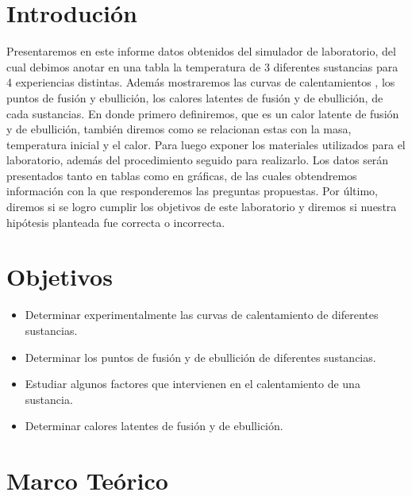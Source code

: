 \documentclass[a4paper, 12p]{article}
\begin{document}
\section{Introdución}
Presentaremos en este informe datos obtenidos del simulador de laboratorio, del cual debimos anotar en una tabla la temperatura de 3 diferentes sustancias para 4 experiencias distintas. Además mostraremos las curvas de calentamientos , los puntos de fusión y ebullición, los calores latentes de fusión y de ebullición, de cada sustancias.
En donde primero definiremos, que es un calor latente de fusión y de ebullición, también diremos como se relacionan estas con la masa, temperatura inicial y el calor. Para luego exponer los materiales utilizados para el laboratorio, además del procedimiento seguido para realizarlo.
Los datos serán presentados tanto en tablas como en gráficas, de las cuales obtendremos información con la que responderemos las preguntas propuestas. 
Por último, diremos si se logro cumplir los objetivos de este laboratorio y diremos si nuestra hipótesis planteada fue correcta o incorrecta.

\section{Objetivos}
\begin{itemize}
      \item Determinar experimentalmente las curvas de calentamiento de diferentes sustancias.
      \item Determinar los puntos de fusión y de ebullición de diferentes sustancias.
      \item Estudiar algunos factores que intervienen en el calentamiento de una sustancia.
      \item Determinar calores latentes de fusión y de ebullición.
\end{itemize}




\section{Marco Teórico} 
\end{document}
